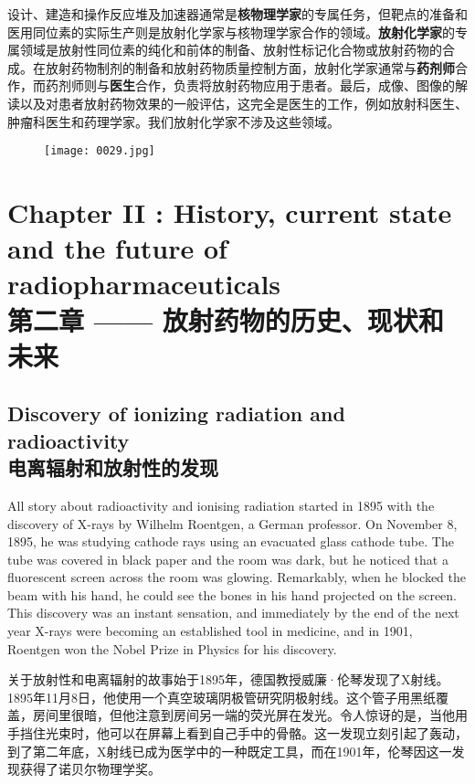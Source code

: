 \documentclass[dvipsnames, svgnames,a4paper,11pt]{article}
\begin{document}
设计、建造和操作反应堆及加速器通常是\textbf{核物理学家}的专属任务，但靶点的准备和医用同位素的实际生产则是放射化学家与核物理学家合作的领域。\textbf{放射化学家}的专属领域是放射性同位素的纯化和前体的制备、放射性标记化合物或放射药物的合成。在放射药物制剂的制备和放射药物质量控制方面，放射化学家通常与\textbf{药剂师}合作，而药剂师则与\textbf{医生}合作，负责将放射药物应用于患者。最后，成像、图像的解读以及对患者放射药物效果的一般评估，这完全是医生的工作，例如放射科医生、肿瘤科医生和药理学家。我们放射化学家不涉及这些领域。

\begin{figure}[htbp]
      \centering
      \texttt{[image: 0029.jpg]}
       \label{fig15}
\end{figure}

\newpage


\section{Chapter II : History, current state and the future of radiopharmaceuticals\\第二章 —— 放射药物的历史、现状和未来}

\subsection{Discovery of ionizing radiation and radioactivity\\电离辐射和放射性的发现}

All story about radioactivity and ionising radiation started in 1895 with the discovery of X-rays by Wilhelm Roentgen, a German professor. On November 8, 1895, he was studying cathode rays using an evacuated glass cathode tube. The tube was covered in black paper and the room was dark, but he noticed that a fluorescent screen across the room was glowing. Remarkably, when he blocked the beam with his hand, he could see the bones in his hand projected on the screen. This discovery was an instant sensation, and immediately by the end of the next year X-rays were becoming an established tool in medicine, and in 1901, Roentgen won the Nobel Prize in Physics for his discovery.

关于放射性和电离辐射的故事始于1895年，德国教授威廉·伦琴发现了X射线。1895年11月8日，他使用一个真空玻璃阴极管研究阴极射线。这个管子用黑纸覆盖，房间里很暗，但他注意到房间另一端的荧光屏在发光。令人惊讶的是，当他用手挡住光束时，他可以在屏幕上看到自己手中的骨骼。这一发现立刻引起了轰动，到了第二年底，X射线已成为医学中的一种既定工具，而在1901年，伦琴因这一发现获得了诺贝尔物理学奖。
\end{document}
